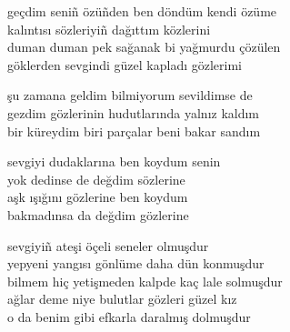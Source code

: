 \documentclass[10pt, openright, oneside]{memoir}
\theoremstyle{definition}
\begin{document}
\vspace*{\fill}
%
\newpage
{}
\vspace*{\fill}
\settowidth{\versewidth}{geçdim seni\~n özü\~nden ben döndüm kendi özüme}
\begin{cverse}
  geçdim seni\~n özü\~nden ben döndüm kendi özüme \\
  kalıntısı sözleriyi\~n dağıttım közlerini \\
  duman duman pek sağanak bi yağmurdu çözülen \\
  göklerden sevgindi güzel kapladı gözlerimi \\
\end{cverse}
\vspace*{\fill}
%
\newpage
{}
\vspace*{\fill}
\settowidth{\versewidth}{gezdim gözlerinin hudutlarında yalnız kaldım}
\begin{cverse}
  şu zamana geldim bilmiyorum sevildimse de \\
  gezdim gözlerinin hudutlarında yalnız kaldım \\
  bir küreydim biri parçalar beni bakar sandım \\
\end{cverse}
\vspace*{\fill}
%
\newpage
{}
\vspace*{\fill}
\settowidth{\versewidth}{sevgiyi dudaklarına ben koydum senin}
\begin{cverse}
  sevgiyi dudaklarına ben koydum senin \\
  yok dedinse de değdim sözlerine \\
  aşk ışığını gözlerine ben koydum \\
  bakmadınsa da değdim gözlerine \\
\end{cverse}
\vspace*{\fill}
%
\newpage
{}
\vspace*{\fill}
\settowidth{\versewidth}{bilmem hiç yetişmeden kalpde kaç lale solmuşdur}
\begin{cverse}
  sevgiyi\~n ateşi öçeli seneler olmuşdur \\
  yepyeni yangısı gönlüme daha dün konmuşdur \\
  bilmem hiç yetişmeden kalpde kaç lale solmuşdur \\
  ağlar deme niye bulutlar gözleri güzel kız \\
  o da benim gibi efkarla daralmış dolmuşdur \\
\end{cverse}
\end{document}
